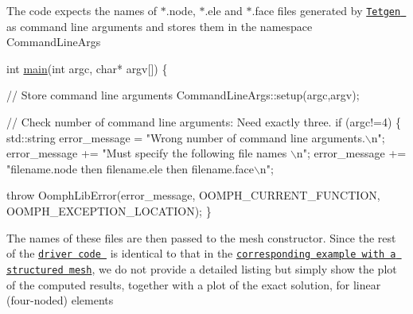 The code expects the names of {\ttfamily $\ast$}.{\ttfamily node}, $\ast$.{\ttfamily ele} and $\ast$.{\ttfamily face} files generated by \href{http://wias-berlin.de/software/tetgen//}{\tt {\ttfamily Tetgen} } as command line arguments and stores them in the namespace {\ttfamily Command\+Line\+Args} 

 
\begin{DoxyCodeInclude}
\textcolor{keywordtype}{int} \hyperlink{mesh__from__tetgen__navier__stokes_8cc_a0ddf1224851353fc92bfbff6f499fa97}{main}(\textcolor{keywordtype}{int} argc, \textcolor{keywordtype}{char}* argv[])
\{
 
\textcolor{comment}{// Store command line arguments}
 CommandLineArgs::setup(argc,argv);

 \textcolor{comment}{// Check number of command line arguments: Need exactly three.}
 \textcolor{keywordflow}{if} (argc!=4)
  \{
   std::string error\_message =
    \textcolor{stringliteral}{"Wrong number of command line arguments.\(\backslash\)n"};
   error\_message +=
    \textcolor{stringliteral}{"Must specify the following file names  \(\backslash\)n"};
   error\_message += 
    \textcolor{stringliteral}{"filename.node then filename.ele then filename.face\(\backslash\)n"};

   \textcolor{keywordflow}{throw} OomphLibError(error\_message,
                       OOMPH\_CURRENT\_FUNCTION,
                       OOMPH\_EXCEPTION\_LOCATION);
  \}

\end{DoxyCodeInclude}


The names of these files are then passed to the mesh constructor. Since the rest of the \href{../../../../demo_drivers/meshing/mesh_from_tetgen/mesh_from_tetgen_poisson.cc}{\tt driver code } is identical to that in the \href{../../../../doc/poisson/eighth_sphere_poisson/html/index.html}{\tt corresponding example with a structured mesh}, we do not provide a detailed listing but simply show the plot of the computed results, together with a plot of the exact solution, for linear (four-\/noded) elements

